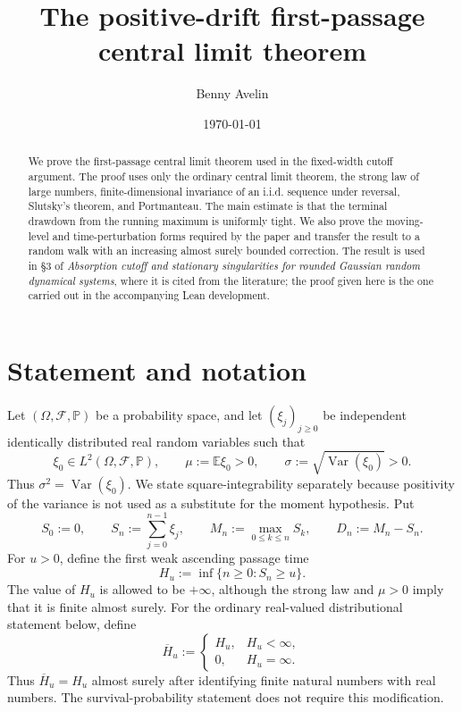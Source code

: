 \documentclass[10pt,reqno,a4paper]{amsart}
\title[First-passage central limit theorem]{The positive-drift first-passage
central limit theorem}
\author{Benny Avelin}
\date{\today}
\numberwithin{equation}{section}
\theoremstyle{plain}
\theoremstyle{definition}
\theoremstyle{remark}
\newcommand{\Pp}{\mathbb{P}}
\newcommand{\Ee}{\mathbb{E}}
\newcommand{\1}{\mathbf{1}}
\DeclareMathOperator{\Var}{Var}
\begin{document}
\begin{abstract}
  We prove the first-passage central limit theorem used in the fixed-width
  cutoff argument.  The proof uses only the ordinary central limit theorem,
  the strong law of large numbers, finite-dimensional invariance of an
  i.i.d. sequence under reversal, Slutsky's theorem, and Portmanteau.  The
  main estimate is that the terminal drawdown from the running maximum is
  uniformly tight.  We also prove the moving-level and time-perturbation
  forms required by the paper and transfer the result to a random walk with
  an increasing almost surely bounded correction.  The result is used in
  \S3 of \emph{Absorption cutoff and stationary singularities for rounded
  Gaussian random dynamical systems}, where it is cited from the literature;
  the proof given here is the one carried out in the accompanying Lean
  development.
\end{abstract}

\maketitle
\enlargethispage{2pt}

\section{Statement and notation}\label{sec:statement}

Let $(\Omega,\mathcal F,\Pp)$ be a probability space, and let
$(\xi_j)_{j\geq0}$ be independent identically distributed real random
variables such that
\begin{equation}\label{eq:moments}
  \xi_0\in L^2(\Omega,\mathcal F,\Pp),
  \qquad
  \mu:=\Ee\xi_0>0,
  \qquad
  \sigma:=\sqrt{\Var(\xi_0)}>0.
\end{equation}
Thus $\sigma^2=\Var(\xi_0)$.  We state square-integrability separately
because positivity of the variance is not used as a substitute for the
moment hypothesis.
Put
\begin{equation}\label{eq:walk-maximum-drawdown}
  S_0:=0,
  \qquad
  S_n:=\sum_{j=0}^{n-1}\xi_j,
  \qquad
  M_n:=\max_{0\leq k\leq n}S_k,
  \qquad
  D_n:=M_n-S_n.
\end{equation}
For $u>0$, define the first weak ascending passage time
\begin{equation}\label{eq:hitting-time}
  H_u:=\inf\{n\geq0:S_n\geq u\}.
\end{equation}
The value of $H_u$ is allowed to be $+\infty$, although the strong law and
$\mu>0$ imply that it is finite almost surely.  For the ordinary real-valued
distributional statement below, define
\begin{equation}\label{eq:finite-hitting-version}
  \overline H_u
  :=
  \begin{cases}
    H_u,&H_u<\infty,\\
    0,&H_u=\infty.
  \end{cases}
\end{equation}
Thus $\overline H_u=H_u$ almost surely after identifying finite natural
numbers with real numbers.  The survival-probability statement does not
require this modification.
\end{document}
